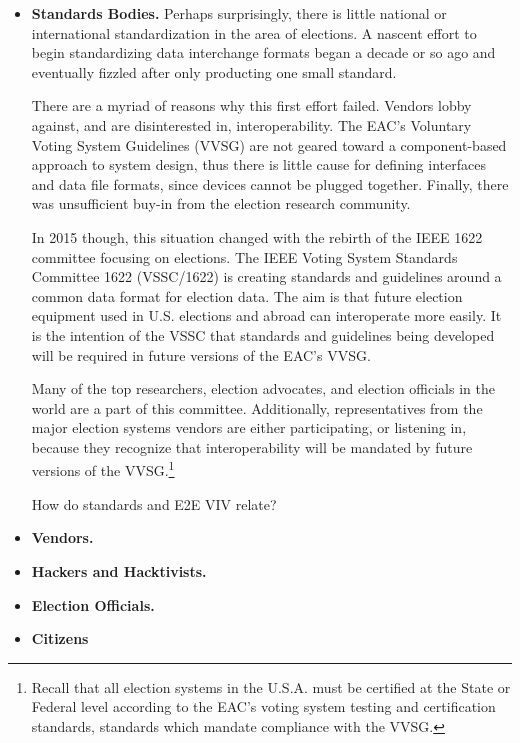 \begin{itemize}
\item \textbf{Standards Bodies.} Perhaps surprisingly, there is little
  national or international standardization in the area of elections.
  A nascent effort to begin standardizing data interchange formats
  began a decade or so ago and eventually fizzled after only
  producting one small standard.

  There are a myriad of reasons why this first effort failed. Vendors
  lobby against, and are disinterested in, interoperability. The EAC's
  Voluntary Voting System Guidelines (VVSG) are not geared toward a
  component-based approach to system design, thus there is little
  cause for defining interfaces and data file formats, since devices
  cannot be plugged together. Finally, there was unsufficient buy-in
  from the election research community.

  In 2015 though, this situation changed with the rebirth of the IEEE
  1622 committee focusing on elections. The IEEE Voting System
  Standards Committee 1622 (VSSC/1622) is creating standards and
  guidelines around a common data format for election data. The aim is
  that future election equipment used in U.S. elections and
  abroad can interoperate more easily. It is the intention of the VSSC
  that standards and guidelines being developed will be required in
  future versions of the EAC's VVSG.

  Many of the top researchers, election advocates, and election
  officials in the world are a part of this committee. Additionally,
  representatives from the major election systems vendors are either
  participating, or listening in, because they recognize that
  interoperability will be mandated by future versions of the
  VVSG.\footnote{Recall that all election systems in the U.S.A. must
    be certified at the State or Federal level according to the EAC's
    voting system testing and certification standards, standards which
    mandate compliance with the VVSG.}

How do standards and E2E VIV relate?

\item \textbf{Vendors.}
\item \textbf{Hackers and Hacktivists.}
\item \textbf{Election Officials.}
\item \textbf{Citizens}
\end{itemize}

